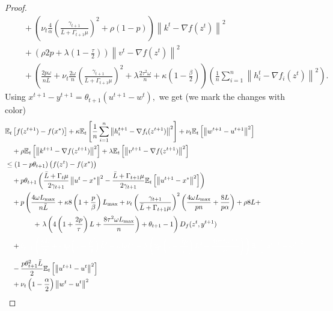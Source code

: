 \documentclass{article} %
\newcommand{\norm}[1]{\left\| #1 \right\|}
\newcommand{\ExpSub}[2]{{\mathbb{E}}_{#1}\left[#2\right]}
\theoremstyle{plain}
\theoremstyle{definition}
\theoremstyle{remark}
\newcommand{\red}{\color{mydarkred}}
\begin{document}
\begin{proof}
\begin{align*}
    &\quad + \left(\nu_{t} \frac{4}{\alpha} \left(\frac{\gamma_{t+1}}{\bar{L} + \Gamma_{t+1} \mu}\right)^2 + \rho (1 - p)\right) \norm{k^{t} - \nabla f(z^t)}^2 \\
    &\quad + \left(\rho 2 p + \lambda \left(1 - \frac{\tau}{2}\right)\right) \norm{v^{t} - \nabla f(z^t)}^2 \\
    &\quad + \left(\frac{2 p \omega}{n \bar{L}} + \nu_{t} \frac{2 \omega}{n} \left(\frac{\gamma_{t+1}}{\bar{L} + \Gamma_{t+1} \mu}\right)^2 + \lambda \frac{2 \tau^2 \omega}{n} + \kappa \left(1 - \frac{\beta}{2}\right)\right) \left(\frac{1}{n}\sum_{i=1}^n \norm{h_i^t - \nabla f_i(z^{t})}^2\right).
  \end{align*}
  Using $x^{t+1} - y^{t+1} = \theta_{t+1} \left(u^{t+1} - w^t\right),$ we get (we mark the changes with color)
  \begin{align*}
    &\ExpSub{t}{f(z^{t+1}) - f(x^*)} + \kappa \ExpSub{t}{\frac{1}{n}\sum_{i=1}^n \norm{h_i^{t+1} - \nabla f_i(z^{t+1})}^2} + \nu_{t} \ExpSub{t}{\norm{w^{t+1} - u^{t+1}}^2}\\
    &\quad  + \rho \ExpSub{t}{\norm{k^{t+1} - \nabla f(z^{t+1})}^2} + \lambda \ExpSub{t}{\norm{v^{t+1} - \nabla f(z^{t+1})}^2}\\
    &\leq (1 - p\theta_{t+1}) \left(f(z^{t}) - f(x^*)\right) \\
    &\quad+ p\theta_{t+1} \left(\frac{\bar{L} + \Gamma_{t} \mu}{2 \gamma_{t+1}} \norm{u^t - x^*}^2 - \frac{\bar{L} + \Gamma_{t+1} \mu}{2 \gamma_{t+1}} \ExpSub{t}{\norm{u^{t+1} - x^*}^2}\right) \\
    &\quad+ p\left(\frac{4 \omega L_{\max}}{n \bar{L}} + \kappa 8 \left(1 + \frac{p}{\beta}\right) L_{\max} + \nu_{t} \left(\frac{\gamma_{t+1}}{\bar{L} + \Gamma_{t+1} \mu}\right)^2\left(\frac{4 \omega L_{\max}}{p n} + \frac{8L}{p \alpha}\right) + \rho 8 L +  \right. \\
    &\qquad\qquad+ \left. \lambda \left(4 \left(1 + \frac{2 p}{\tau}\right) L + \frac{8 \tau^2 \omega L_{\max}}{n}\right) + \theta_{t+1} - 1\right) D_f(z^t, y^{t+1}) \\
    &\quad+ \red{\theta_{t+1}^2 \left(\frac{pL}{2} + \kappa 4 p \left(1 + \frac{p}{\beta}\right) \widehat{L}^2 + \rho 4 p L^2 + \lambda \left(2 p \left(1 + \frac{2 p}{\tau}\right) L^2 + \frac{4 p \tau^2 \omega \widehat{L}^2}{n}\right) \right) \ExpSub{t}{\norm{u^{t+1} - w^t}^2}} \\
    &\quad - \frac{p \theta_{t+1}^2 \bar{L}}{2} \ExpSub{t}{\norm{u^{t+1} - u^t}^2} \\
    &\quad + \nu_{t} \left(1 - \frac{\alpha}{2}\right) \norm{w^t - u^t}^2 \\

\end{align*}
\end{proof}
\end{document}
